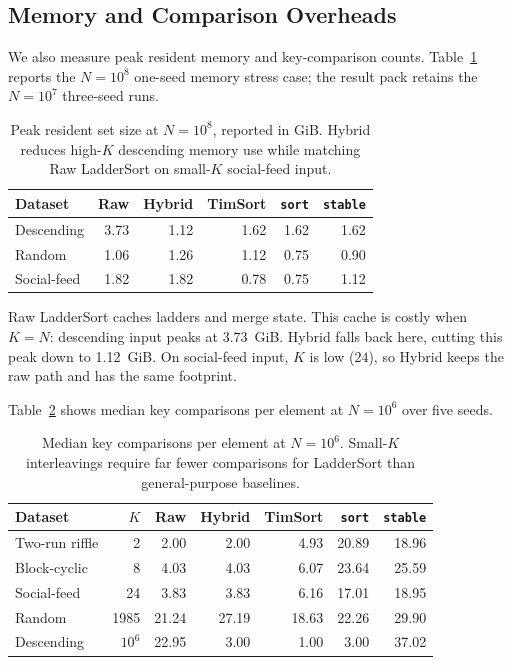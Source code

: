 \documentclass[10pt]{article}
\begin{document}
\subsection{Memory and Comparison Overheads}
\label{memory-and-comparison-overheads}

We also measure peak resident memory and key-comparison counts. Table~\ref{tab:phase5-memory} reports the \(N=10^8\) one-seed memory stress case; the result pack retains the \(N=10^7\) three-seed runs.

\begin{table}[H]
\centering
\scriptsize
\caption{Peak resident set size at \(N=10^8\), reported in GiB. Hybrid reduces high-\(K\) descending memory use while matching Raw LadderSort on small-\(K\) social-feed input.}
\label{tab:phase5-memory}
\begin{tabular}{@{}lrrrrr@{}}
\toprule
Dataset & Raw & Hybrid & TimSort & \texttt{sort} & \texttt{stable} \\
\midrule
Descending & 3.73 & 1.12 & 1.62 & 1.62 & 1.62 \\
Random & 1.06 & 1.26 & 1.12 & 0.75 & 0.90 \\
Social-feed & 1.82 & 1.82 & 0.78 & 0.75 & 1.12 \\
\bottomrule
\end{tabular}
\end{table}

Raw LadderSort caches ladders and merge state. This cache is costly when \(K=N\): descending input peaks at 3.73~GiB. Hybrid falls back here, cutting this peak down to 1.12~GiB. On social-feed input, \(K\) is low (\(24\)), so Hybrid keeps the raw path and has the same footprint.

Table~\ref{tab:phase5-comparisons} shows median key comparisons per element at \(N=10^6\) over five seeds.

\begin{table}[H]
\centering
\scriptsize
\caption{Median key comparisons per element at \(N=10^6\). Small-\(K\) interleavings require far fewer comparisons for LadderSort than general-purpose baselines.}
\label{tab:phase5-comparisons}
\begin{tabular}{@{}lrrrrrr@{}}
\toprule
Dataset & \(K\) & Raw & Hybrid & TimSort & \texttt{sort} & \texttt{stable} \\
\midrule
Two-run riffle & 2 & 2.00 & 2.00 & 4.93 & 20.89 & 18.96 \\
Block-cyclic & 8 & 4.03 & 4.03 & 6.07 & 23.64 & 25.59 \\
Social-feed & 24 & 3.83 & 3.83 & 6.16 & 17.01 & 18.95 \\
Random & 1985 & 21.24 & 27.19 & 18.63 & 22.26 & 29.90 \\
Descending & \(10^6\) & 22.95 & 3.00 & 1.00 & 3.00 & 37.02 \\
\bottomrule
\end{tabular}
\end{table}
\end{document}
